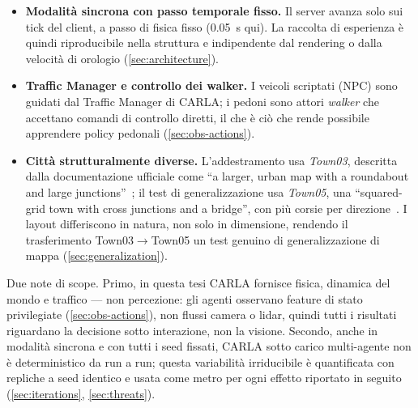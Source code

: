 \begin{itemize}
  \item \textbf{Modalità sincrona con passo temporale fisso.} Il server
        avanza solo sui tick del client, a passo di fisica fisso
        (\SI{0.05}{s} qui). La raccolta di esperienza è quindi
        riproducibile nella struttura e indipendente dal rendering o
        dalla velocità di orologio (\cref{sec:architecture}).
  \item \textbf{Traffic Manager e controllo dei walker.} I veicoli
        scriptati (NPC) sono guidati dal Traffic Manager di CARLA; i
        pedoni sono attori \emph{walker} che accettano comandi di
        controllo diretti, il che è ciò che rende possibile apprendere
        policy pedonali (\cref{sec:obs-actions}).
  \item \textbf{Città strutturalmente diverse.} L'addestramento usa
        \emph{Town03}, descritta dalla documentazione ufficiale come
        ``a larger, urban map with a roundabout and large
        junctions''~\cite{carladocs}; il test di generalizzazione usa
        \emph{Town05}, una ``squared-grid town with cross junctions and
        a bridge'', con più corsie per direzione~\cite{carladocs}. I
        layout differiscono in natura, non solo in dimensione, rendendo
        il trasferimento Town03$\to$Town05 un test genuino di
        generalizzazione di mappa (\cref{sec:generalization}).
\end{itemize}

Due note di scope. Primo, in questa tesi CARLA fornisce fisica, dinamica
del mondo e traffico --- non percezione: gli agenti osservano feature di
stato privilegiate (\cref{sec:obs-actions}), non flussi camera o lidar,
quindi tutti i risultati riguardano la decisione sotto interazione, non
la visione. Secondo, anche in modalità sincrona e con tutti i seed
fissati, CARLA sotto carico multi-agente non è deterministico da run a
run; questa variabilità irriducibile è quantificata con repliche a seed
identico e usata come metro per ogni effetto riportato in seguito
(\cref{sec:iterations}, \cref{sec:threats}).
